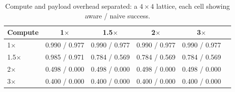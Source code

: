 \begin{table}
\centering
\footnotesize
\caption{Compute and payload overhead separated: a $4\times4$ lattice, each cell showing aware / naive success.}
\label{tab:p2-cpsplit}
\begin{tabular}{lccccc}
\toprule
Compute & 1$\times$ & 1.5$\times$ & 2$\times$ & 3$\times$ \\
\midrule
1$\times$ & 0.990 / 0.977 & 0.990 / 0.977 & 0.990 / 0.977 & 0.990 / 0.977 \\
1.5$\times$ & 0.985 / 0.971 & 0.784 / 0.569 & 0.784 / 0.569 & 0.784 / 0.569 \\
2$\times$ & 0.498 / 0.000 & 0.498 / 0.000 & 0.498 / 0.000 & 0.498 / 0.000 \\
3$\times$ & 0.400 / 0.000 & 0.400 / 0.000 & 0.400 / 0.000 & 0.400 / 0.000 \\
\bottomrule
\end{tabular}
\par\vspace{2pt}{\footnotesize\raggedright The compute axis carries the whole effect. The payload axis is flat except in one cell, where it moves the request across a deadline; bytes alone do not decide feasibility.\par}
\end{table}
